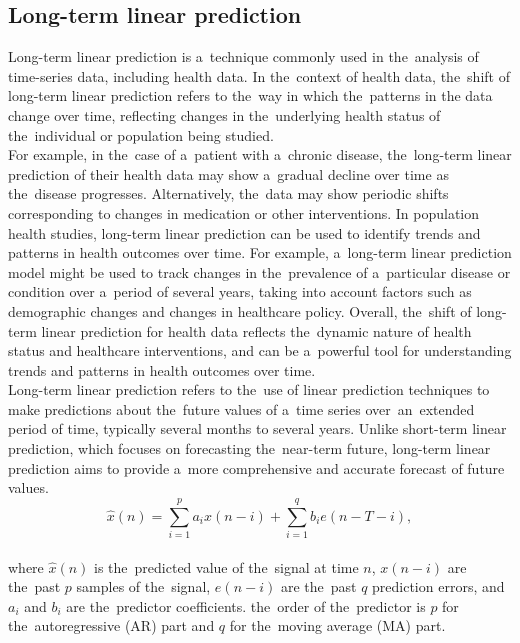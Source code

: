 \subsection{Long-term linear prediction}\label{subsec:longlp}
Long-term linear prediction is a~technique commonly used in the~analysis of time-series data, including health data.
In the~context of health data, the~shift of long-term linear prediction refers to the~way in which the~patterns in the
data change over time, reflecting changes in the~underlying health status of the~individual or population being studied.\\
For example, in the~case of a~patient with a~chronic disease, the~long-term linear prediction of their health data may
show a~gradual decline over time as the~disease progresses. Alternatively, the~data may show periodic shifts
corresponding to changes in medication or other interventions. In population health studies, long-term linear
prediction can be used to identify trends and patterns in health outcomes over time. For example, a~long-term linear
prediction model might be used to track changes in the~prevalence of a~particular disease or condition
over a~period of several years, taking into account factors such as demographic changes and changes in healthcare policy.
Overall, the~shift of long-term linear prediction for health data reflects the~dynamic nature of health status and
healthcare interventions, and can be a~powerful tool for understanding trends and patterns in health outcomes over time.
\\
Long-term linear prediction refers to the~use of linear prediction techniques to make predictions about the~future
values of a~time series over~an~extended period of time, typically several months to several years. Unlike short-term
linear prediction, which focuses on forecasting the~near-term future, long-term linear prediction aims to provide a~more
comprehensive and accurate forecast of future values.\\
\begin{equation}\label{eq:ltlp}
    \hat{x}(n) = \sum_{i=1}^{p} a_i x(n-i) + \sum_{i=1}^{q} b_i e(n-T-i),
\end{equation}
\\
where $\hat{x}(n)$ is the~predicted value of the~signal at time $n$, $x(n-i)$ are the~past $p$ samples of the~signal, $e(n-i)$ are the~past $q$ prediction errors, and $a_i$ and $b_i$ are the~predictor coefficients. the~order of the~predictor is $p$ for the~autoregressive (AR) part and $q$ for the~moving average (MA) part.

